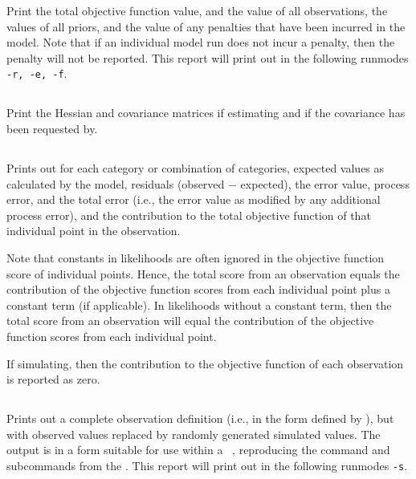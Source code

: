 Print the total objective function value, and the value of all observations, the values of all priors, and the value of any penalties that have been incurred in the model. Note that if an individual model run does not incur a penalty, then the penalty will not be reported. This report will print out in the following runmodes \texttt{-r, -e, -f}.

\subsection{}

Print the Hessian and covariance matrices if estimating and if the covariance has been requested by.

\subsection{}

Prints out for each category or combination of categories, expected values as calculated by the model, residuals (observed $-$ expected), the error value, process error, and the total error (i.e., the error value as modified by any additional process error), and the contribution to the total objective function of that individual point in the observation. 

Note that constants in likelihoods are often ignored in the objective function score of individual points. Hence, the total score from an observation equals the contribution of the objective function scores from each individual point plus a constant term (if applicable). In likelihoods without a constant term, then the total score from an observation will equal the contribution of the objective function scores from each individual point.

If simulating, then the contribution to the objective function of each observation is reported as zero. 

\subsection{}

Prints out a complete observation definition (i.e., in the form defined by ), but with observed values replaced by randomly generated simulated values. The output is in a form  suitable for use within a \CNAME\ \config, reproducing the command and subcommands from the \config. This report will print out in the following runmodes \texttt{-s}.

